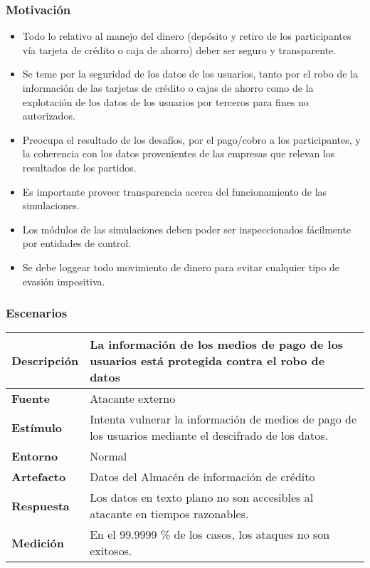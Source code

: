 \subsubsection*{Motivación}
\begin{itemize}
\item Todo lo relativo al manejo del dinero (depósito y retiro de los participantes vía tarjeta de crédito o caja de ahorro) deber ser seguro y transparente.
\item Se teme por la seguridad de los datos de los usuarios, tanto por el robo de la información de las tarjetas de crédito o cajas de ahorro como de la explotación de los datos de los usuarios por terceros para fines no autorizados.
\item Preocupa el resultado de los desafíos, por el pago/cobro a los participantes, y la coherencia con los datos provenientes de las empresas que relevan los resultados de los partidos.
\item Es importante proveer transparencia acerca del funcionamiento de las simulaciones. 
\item Los módulos de las simulaciones deben poder ser inspeccionados fácilmente por entidades de control.
\item Se debe loggear todo movimiento de dinero para evitar cualquier tipo de evasión impositiva.
\end{itemize}

\subsubsection*{Escenarios}
\begin{center}
  \begin{tabular}{| l | p{10cm} | }
    \hline
	\textbf{Descripción} & La información de los medios de pago de los usuarios está protegida contra el robo de datos\\  \hline
	\textbf{Fuente} & Atacante externo\\  \hline
	\textbf{Estímulo} & Intenta vulnerar la información de medios de pago de los usuarios mediante el descifrado de los datos.\\  \hline
	\textbf{Entorno} & Normal\\  \hline
	\textbf{Artefacto} & Datos del Almacén de información de crédito \\  \hline
	\textbf{Respuesta} & Los datos en texto plano no son accesibles al atacante en tiempos razonables.\\  \hline
	\textbf{Medición} & En el 99.9999 \% de los casos, los ataques no son exitosos.\\  \hline
  \end{tabular}
\end{center}

